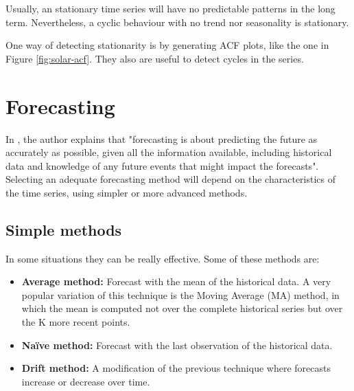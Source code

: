 Usually, an stationary time series will have no predictable patterns in the long term. Nevertheless, a cyclic behaviour with no trend nor seasonality is stationary.

One way of detecting stationarity is by generating ACF plots, like the one in Figure \ref{fig:solar-acf}. They also are useful to detect cycles in the series.


\section{Forecasting}
In \cite{hyndman2018forecasting}, the author explains that "forecasting is about predicting the future as accurately as possible, given all the information available, including historical data and knowledge of any future events that might impact the forecasts".
Selecting an adequate forecasting method will depend on the characteristics of the time series, using simpler or more advanced methods.

\subsection{Simple methods}
In some situations they can be really effective. Some of these methods are: \cite{hyndman2018forecasting}
\begin{itemize}
    \item \textbf{Average method:} Forecast with the mean of the historical data. A very popular variation of this technique is the Moving Average (MA) method, in which the mean is computed not over the complete historical series but over the K more recent points.
    \item \textbf{Naïve method:} Forecast with the last observation of the historical data.
    \item \textbf{Drift method:} A modification of the previous technique where forecasts increase or decrease over time.
\end{itemize}

